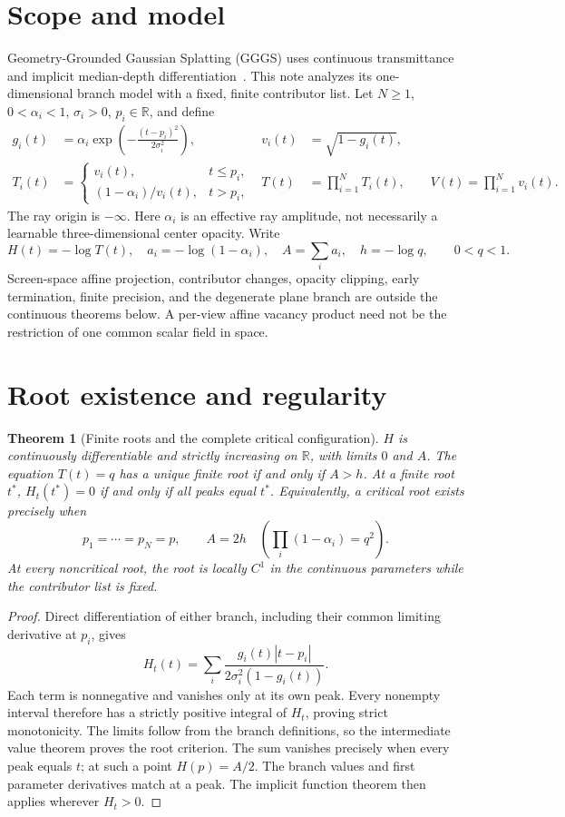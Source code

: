 \documentclass[11pt,a4paper]{article}
\newtheorem{theorem}{Theorem}
\newcommand{\R}{\mathbb{R}}
\begin{document}
\section{Scope and model}
Geometry-Grounded Gaussian Splatting (GGGS) uses continuous transmittance and
implicit median-depth differentiation~\cite{gggs}. This note analyzes its
one-dimensional branch model with a fixed, finite contributor list.
Let $N\geq1$, $0<\alpha_i<1$, $\sigma_i>0$, $p_i\in\R$, and define
\begin{align}
 g_i(t)&=\alpha_i\exp\!\left(-\frac{(t-p_i)^2}{2\sigma_i^2}\right),&
 v_i(t)&=\sqrt{1-g_i(t)},\\
 T_i(t)&=\begin{cases}
 v_i(t),&t\leq p_i,\\
 (1-\alpha_i)/v_i(t),&t>p_i,
 \end{cases}&
 T(t)&=\prod_{i=1}^N T_i(t),\qquad V(t)=\prod_{i=1}^N v_i(t).
\end{align}
The ray origin is $-\infty$. Here $\alpha_i$ is an effective ray amplitude,
not necessarily a learnable three-dimensional center opacity.
Write
\[
 H(t)=-\log T(t),\quad a_i=-\log(1-\alpha_i),\quad
 A=\sum_i a_i,\quad h=-\log q,\qquad 0<q<1.
\]
Screen-space affine projection, contributor changes, opacity clipping, early
termination, finite precision, and the degenerate plane branch are outside the
continuous theorems below. A per-view affine vacancy product need not be the
restriction of one common scalar field in space.

\section{Root existence and regularity}
\begin{theorem}[Finite roots and the complete critical configuration]
\label{thm:root}
$H$ is continuously differentiable and strictly increasing on $\R$, with limits
$0$ and $A$. The equation $T(t)=q$ has a unique finite root if and only if $A>h$.
At a finite root $t^*$, $H_t(t^*)=0$ if and only if all peaks equal $t^*$.
Equivalently, a critical root exists precisely when
\[
 p_1=\cdots=p_N=p,\qquad A=2h
 \quad\left(\prod_i(1-\alpha_i)=q^2\right).
\]
At every noncritical root, the root is locally $C^1$ in the continuous
parameters while the contributor list is fixed.
\end{theorem}
\begin{proof}
Direct differentiation of either branch, including their common limiting
derivative at $p_i$, gives
\[
 H_t(t)=\sum_i
 \frac{g_i(t)|t-p_i|}{2\sigma_i^2(1-g_i(t))}.
\]
Each term is nonnegative and vanishes only at its own peak. Every nonempty
interval therefore has a strictly positive integral of $H_t$, proving strict
monotonicity. The limits follow from the branch definitions, so the intermediate
value theorem proves the root criterion. The sum vanishes precisely when every
peak equals $t$; at such a point $H(p)=A/2$. The branch values and first
parameter derivatives match at a peak. The implicit function theorem then
applies wherever $H_t>0$.
\end{proof}
\end{document}
